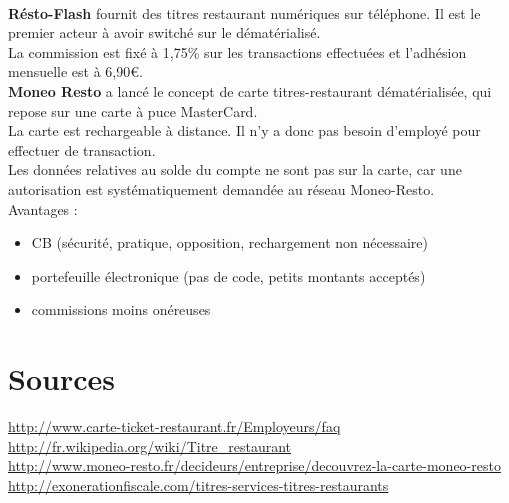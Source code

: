 ~\\
\textbf{Résto-Flash} fournit des titres restaurant numériques sur téléphone. Il
est le premier acteur à avoir switché sur le dématérialisé. \\

La commission est fixé à 1,75\% sur les transactions effectuées et l'adhésion
mensuelle est à 6,90\euro. \\

\textbf{Moneo Resto} a lancé le concept de carte titres-restaurant
dématérialisée, qui repose sur une carte à puce MasterCard. \\

La carte est rechargeable à distance. Il n'y a donc pas besoin d'employé pour
effectuer de transaction. \\

Les données relatives au solde du compte ne sont pas sur la carte, car une
autorisation est systématiquement demandée au réseau Moneo-Resto. \\

Avantages :
\begin{itemize}
  \item CB (sécurité, pratique, opposition, rechargement non nécessaire)
  \item portefeuille électronique (pas de code, petits montants acceptés)
  \item commissions moins onéreuses
\end{itemize}

\section{Sources}
\url{http://www.carte-ticket-restaurant.fr/Employeurs/faq} \\

\url{http://fr.wikipedia.org/wiki/Titre_restaurant} \\

\url{http://www.moneo-resto.fr/decideurs/entreprise/decouvrez-la-carte-moneo-resto} \\

\url{http://exonerationfiscale.com/titres-services-titres-restaurants} \\



